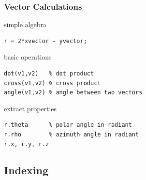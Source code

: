 \documentclass[compress]{beamer}
\begin{document}
\begin{frame}[fragile]
  \frametitle{Vector Calculations}

  simple algebra
\begin{lstlisting}[style=input]
r = 2*xvector - yvector;
\end{lstlisting}

  \pause \medskip


  basic operations
\begin{lstlisting}[style=input]
dot(v1,v2)   % dot product
cross(v1,v2) % cross product
angle(v1,v2) % angle between two vectors
\end{lstlisting}

  \pause \medskip

  extract properties
\begin{lstlisting}[style=input]
r.theta      % polar angle in radiant
r.rho        % azimuth angle in radiant
r.x, r.y, r.z
\end{lstlisting}

\end{frame}


\subsection*{Indexing}
\end{document}
